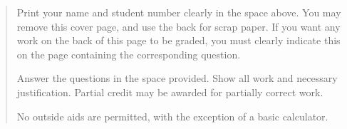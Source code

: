 \documentclass[12pt]{article}
\begin{document}
\vspace{0.1in}

\vspace*{\fill}

\begin{quote}
Print your name and student number clearly in the space above. You may remove this cover page, and use the back for scrap paper. If you want any work on the back of this page to be graded, you must clearly indicate this on the page containing the corresponding question.

\medskip

Answer the questions in the space provided. Show all work and necessary justification. Partial credit may be awarded for partially correct work.
 
\medskip

No outside aids are permitted, with the exception of a basic calculator. 
\end{quote}




\newpage
\end{document}
